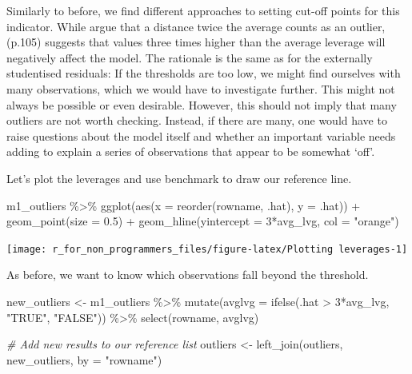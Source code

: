 \documentclass[
]{book}
\newenvironment{Shaded}{\begin{snugshade}}{\end{snugshade}}
\newcommand{\AttributeTok}[1]{\textcolor[rgb]{0.77,0.63,0.00}{#1}}
\newcommand{\CommentTok}[1]{\textcolor[rgb]{0.56,0.35,0.01}{\textit{#1}}}
\newcommand{\DecValTok}[1]{\textcolor[rgb]{0.00,0.00,0.81}{#1}}
\newcommand{\FloatTok}[1]{\textcolor[rgb]{0.00,0.00,0.81}{#1}}
\newcommand{\FunctionTok}[1]{\textcolor[rgb]{0.00,0.00,0.00}{#1}}
\newcommand{\NormalTok}[1]{#1}
\newcommand{\OtherTok}[1]{\textcolor[rgb]{0.56,0.35,0.01}{#1}}
\newcommand{\SpecialCharTok}[1]{\textcolor[rgb]{0.00,0.00,0.00}{#1}}
\newcommand{\StringTok}[1]{\textcolor[rgb]{0.31,0.60,0.02}{#1}}
\begin{document}
Similarly to before, we find different approaches to setting cut-off points for this indicator. While \citet{hoaglin1978hat} argue that a distance twice the average counts as an outlier, \citet{stevens2012applied} (p.105) suggests that values three times higher than the average leverage will negatively affect the model. The rationale is the same as for the externally studentised residuals: If the thresholds are too low, we might find ourselves with many observations, which we would have to investigate further. This might not always be possible or even desirable. However, this should not imply that many outliers are not worth checking. Instead, if there are many, one would have to raise questions about the model itself and whether an important variable needs adding to explain a series of observations that appear to be somewhat `off'.

Let's plot the leverages and use \citet{stevens2012applied} benchmark to draw our reference line.

\begin{Shaded}
\begin{Highlighting}[]
\NormalTok{m1\_outliers }\SpecialCharTok{\%\textgreater{}\%}
  \FunctionTok{ggplot}\NormalTok{(}\FunctionTok{aes}\NormalTok{(}\AttributeTok{x =} \FunctionTok{reorder}\NormalTok{(rowname, .hat),}
             \AttributeTok{y =}\NormalTok{ .hat)) }\SpecialCharTok{+}
  \FunctionTok{geom\_point}\NormalTok{(}\AttributeTok{size =} \FloatTok{0.5}\NormalTok{) }\SpecialCharTok{+}
  \FunctionTok{geom\_hline}\NormalTok{(}\AttributeTok{yintercept =} \DecValTok{3}\SpecialCharTok{*}\NormalTok{avg\_lvg, }\AttributeTok{col =} \StringTok{"orange"}\NormalTok{)}
\end{Highlighting}
\end{Shaded}

\begin{center}\texttt{[image: r\_for\_non\_programmers\_files/figure-latex/Plotting leverages-1]} \end{center}

As before, we want to know which observations fall beyond the threshold.

\begin{Shaded}
\begin{Highlighting}[]
\NormalTok{new\_outliers }\OtherTok{\textless{}{-}}\NormalTok{ m1\_outliers }\SpecialCharTok{\%\textgreater{}\%}
  \FunctionTok{mutate}\NormalTok{(}\AttributeTok{avglvg =} \FunctionTok{ifelse}\NormalTok{(.hat }\SpecialCharTok{\textgreater{}} \DecValTok{3}\SpecialCharTok{*}\NormalTok{avg\_lvg, }\StringTok{"TRUE"}\NormalTok{, }\StringTok{"FALSE"}\NormalTok{)) }\SpecialCharTok{\%\textgreater{}\%}
  \FunctionTok{select}\NormalTok{(rowname, avglvg)}

\CommentTok{\# Add new results to our reference list}
\NormalTok{outliers }\OtherTok{\textless{}{-}} \FunctionTok{left\_join}\NormalTok{(outliers, new\_outliers, }\AttributeTok{by =} \StringTok{"rowname"}\NormalTok{)}
\end{Highlighting}
\end{Shaded}
\end{document}
